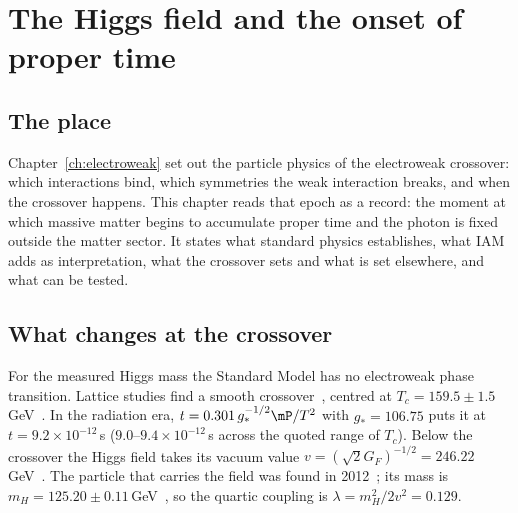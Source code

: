 \chapter{The Higgs field and the onset of proper time}\label{ch:higgsrecord}

\section*{The place}
Chapter~\ref{ch:electroweak} set out the particle physics of the electroweak crossover: which interactions bind, which symmetries the weak
interaction breaks, and when the crossover happens. This chapter reads that epoch as a record: the moment at which massive matter begins to accumulate proper time and the photon is fixed outside the
matter sector. It states what standard physics establishes, what IAM adds as interpretation, what the crossover sets and what is set elsewhere,
and what can be tested.

\section{What changes at the crossover}\label{sec:hr:change}
For the measured Higgs mass the Standard Model has no electroweak phase transition. Lattice studies find a smooth crossover~\cite{Kajantie1996},
centred at $T_c=159.5\pm1.5$\,GeV~\cite{DOnofrio2016}. \observed{} In the radiation era, $t=0.301\,g_*^{-1/2}\mP/T^2$ with $g_*=106.75$ puts it at
$t=9.2\times10^{-12}$\,s ($9.0$--$9.4\times10^{-12}$\,s across the quoted range of $T_c$). \calc{} Below the crossover the Higgs field takes its vacuum
value $v=(\sqrt2G_F)^{-1/2}=246.22$\,GeV~\cite{Englert1964,Higgs1964}. The particle that carries the field was found in 2012~\cite{ATLAS2012Higgs,CMS2012Higgs};
its mass is $m_H=125.20\pm0.11$\,GeV~\cite{PDG2024}, so the quartic coupling is $\lambda=m_H^2/2v^2=0.129$. \calc

